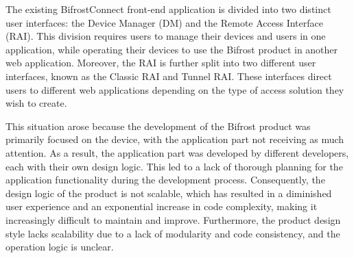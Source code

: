 


The existing BifrostConnect front-end application is divided into two distinct user interfaces:
the Device Manager (DM) and the Remote Access Interface (RAI). 
This division requires users to manage their devices and users in one application, 
while operating their devices to use the Bifrost product in another web application. 
Moreover, the RAI is further split into two different user interfaces, 
known as the Classic RAI and Tunnel RAI. 
These interfaces direct users to different web applications 
depending on the type of access solution they wish to create.

This situation arose because the development of the Bifrost product was primarily focused 
on the device, with the application part not receiving as much attention. 
As a result, the application part was developed by different developers, 
each with their own design logic. 
This led to a lack of thorough planning for the application functionality 
during the development process. Consequently, 
the design logic of the product is not scalable, 
which has resulted in a diminished user experience 
and an exponential increase in code complexity, 
making it increasingly difficult to maintain and improve. 
Furthermore, the product design style lacks scalability due to a lack of modularity 
and code consistency, and the operation logic is unclear.